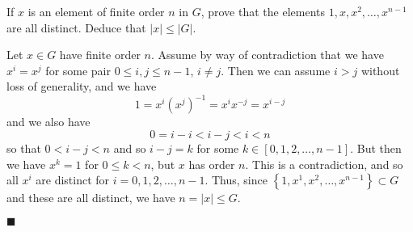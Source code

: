 \documentclass[12pt]{article}
\renewcommand{\qed}{\hfill$\blacksquare$}
\renewenvironment{proof}{\begin{addmargin}[1em]{0em}\begin{newproof}}{\end{newproof}\end{addmargin}\qed}
\newenvironment{problem}[2][Exercise]{\begin{trivlist}
\item[\hskip \labelsep {\bfseries #1}\hskip \labelsep {\bfseries #2.}]}{\end{trivlist}}
\begin{document}
\begin{problem}{1.1.32}
If $x$ is an element of finite order $n$ in $G$, prove that the elements $1,x,x^2,\ldots,x^{n-1}$ are all distinct. Deduce that $\left|x\right| \leq \left|G\right|$.
\end{problem}
\begin{proof}
Let $x\in G$ have finite order $n$. Assume by way of contradiction that we have $x^i=x^j$ for some pair $0\leq i,j \leq n-1$, $i\neq j$. Then we can assume $i>j$ without loss of generality, and we have $$1=x^i\left(x^j\right)^{-1}=x^ix^{-j}=x^{i-j}$$ and we also have $$0=i-i<i-j<i<n$$ so that $0<i-j<n$ and so $i-j=k$ for some $k\in\left[0,1,2,\ldots,n-1\right]$. But then we have $x^k=1$ for $0\leq k < n$, but $x$ has order $n$. This is a contradiction, and so all $x^i$ are distinct for $i=0,1,2,\ldots,n-1$. Thus, since $\left\{1,x^1,x^2,\ldots,x^{n-1}\right\} \subset G$ and these are all distinct, we have $n=\left|x\right| \leq G$.
\end{proof}
\end{document}

